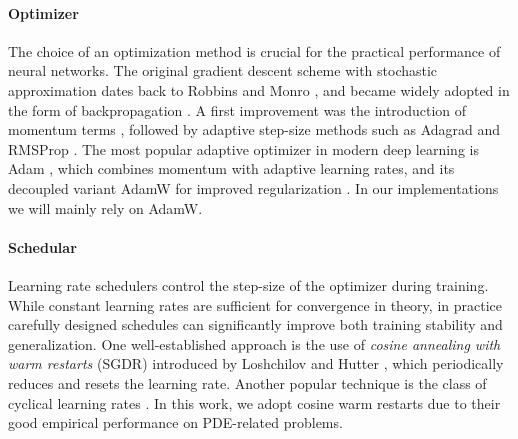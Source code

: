 \paragraph{Optimizer}

The choice of an optimization method is crucial for the practical performance of neural networks. 
The original gradient descent scheme with stochastic approximation dates 
back to Robbins and Monro \cite{robbins1951}, 
and became widely adopted in the form of backpropagation \cite{rumelhart1986}. 
A first improvement was the introduction of momentum terms \cite{qian1999}, 
followed by adaptive step-size methods such as 
Adagrad \cite{duchi2011} and RMSProp \cite{tieleman2012}. 
The most popular adaptive optimizer in modern deep learning is Adam \cite{kingma2015}, 
which combines momentum with adaptive learning rates, and its decoupled variant AdamW 
for improved regularization \cite{loshchilov2019}. 
In our implementations we will mainly rely on AdamW.

\paragraph{Schedular}

Learning rate schedulers control the step-size of the optimizer during training. 
While constant learning rates are sufficient for convergence in theory, 
in practice carefully designed schedules can significantly improve both training stability 
and generalization. 
One well-established approach is the use of \emph{cosine annealing with warm restarts} (SGDR) 
introduced by Loshchilov and Hutter \cite{loshchilov2017}, 
which periodically reduces and resets the learning rate. 
Another popular technique is the class of cyclical learning rates \cite{smith2017}. 
In this work, we adopt cosine warm restarts due to their good empirical performance on PDE-related problems.
